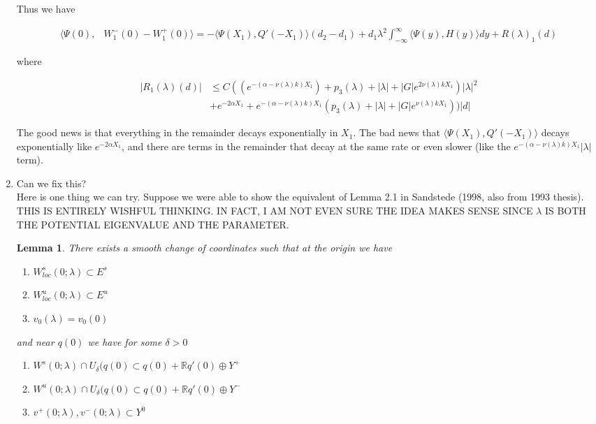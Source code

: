 \documentclass[12pt]{article}
\def\R{{\mathbb R}}
\newtheorem{lemma}{Lemma}
\begin{document}
\begin{enumerate}
Thus we have 

\begin{align*}
\langle \Psi(0), &W_1^-(0) - W_1^+(0) \rangle = 
-\langle \Psi(X_1), Q'(-X_1) \rangle (d_2 - d_1 ) + d_1 \lambda^2 \int_{-\infty}^\infty \langle \Psi(y), H(y) \rangle dy + R(\lambda)_1(d)
\end{align*}

where 

\begin{align*}
|R_1(\lambda)(d)| &\leq C( ( e^{-(\alpha - \nu(\lambda) k)X_1 }) + p_3(\lambda) + |\lambda| + |G|e^{2 \nu(\lambda) k X_1})|\lambda|^2 \\ 
&+ e^{-2 \alpha X_1} + e^{-(\alpha - \nu(\lambda) k)X_1 }(p_3(\lambda) + |\lambda| + |G| e^{\nu(\lambda)k X_1}))|d|
\end{align*}

The good news is that everything in the remainder decays exponentially in $X_1$. The bad news that $\langle \Psi(X_1), Q'(-X_1) \rangle$ decays exponentially like $e^{-2 \alpha X_1}$, and there are terms in the remainder that decay at the same rate or even slower (like the $e^{-(\alpha - \nu(\lambda) k)X_1 } |\lambda|$ term).

\item Can we fix this?\\

Here is one thing we can try. Suppose we were able to show the equivalent of Lemma 2.1 in Sandstede (1998, also from 1993 thesis). THIS IS ENTIRELY WISHFUL THINKING. IN FACT, I AM NOT EVEN SURE THE IDEA MAKES SENSE SINCE $\lambda$ IS BOTH THE POTENTIAL EIGENVALUE AND THE PARAMETER.

\begin{lemma}There exists a smooth change of coordinates such that at the origin we have
\begin{enumerate}
	\item $W^s_{loc}(0; \lambda) \subset E^s$
	\item $W^u_{loc}(0; \lambda) \subset E^u$
	\item $v_0(\lambda) = v_0(0)$
\end{enumerate}
and near $q(0)$ we have for some $\delta > 0$
\begin{enumerate}
	\item $W^s(0; \lambda) \cap U_\delta(q(0) \subset q(0) + \R q'(0) \oplus Y^+ $
	\item $W^u(0; \lambda) \cap U_\delta(q(0) \subset q(0) + \R q'(0) \oplus Y^- $
	\item $v^+(0; \lambda), v^-(0; \lambda) \subset Y^0$
\end{enumerate}
\end{lemma}


\end{enumerate}
\end{document}
